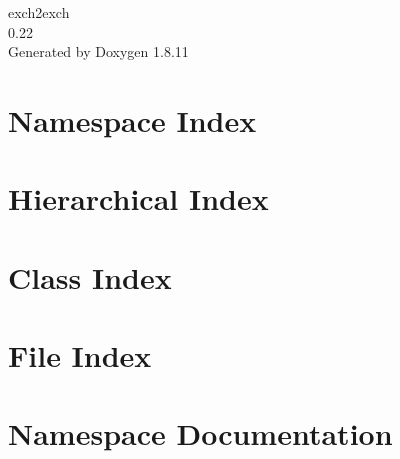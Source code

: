 \documentclass[twoside]{book}
\newcommand{\+}{\discretionary{\mbox{\scriptsize$\hookleftarrow$}}{}{}}
\newcommand{\clearemptydoublepage}{%
  \newpage{\pagestyle{empty}\cleardoublepage}%
}
\begin{document}
\hypersetup{pageanchor=false,
             bookmarksnumbered=true,
             pdfencoding=unicode
            }
\begin{titlepage}
\vspace*{7cm}
\begin{center}%
{\Large exch2exch \\[1ex]\large 0.\+22 }\\
\vspace*{1cm}
{\large Generated by Doxygen 1.8.11}\\
\end{center}
\end{titlepage}
\clearemptydoublepage
\tableofcontents
\clearemptydoublepage
{}
\hypersetup{pageanchor=true}

\chapter{Namespace Index}

\chapter{Hierarchical Index}

\chapter{Class Index}

\chapter{File Index}

\chapter{Namespace Documentation}







\end{document}
